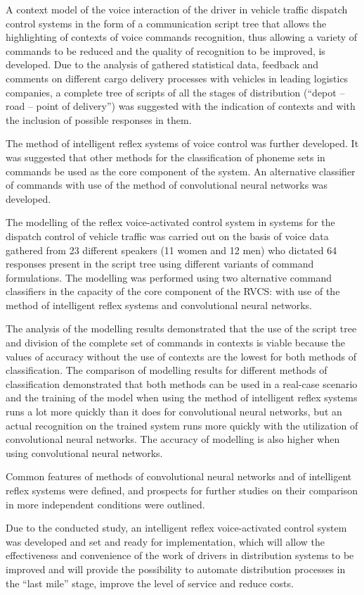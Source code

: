 \documentclass[review,authoryear]{elsarticle}
\begin{document}
A context model of the voice interaction of the driver in vehicle traffic dispatch control systems in the form of a communication script tree that allows the highlighting of contexts of voice commands recognition, thus allowing a variety of commands to be reduced and the quality of recognition to be improved, is developed. Due to the analysis of gathered statistical data, feedback and comments on different cargo delivery processes with vehicles in leading logistics companies, a complete tree of scripts of all the stages of distribution (“depot – road – point of delivery”) was suggested with the indication of contexts and with the inclusion of possible responses in them. 

The method of intelligent reflex systems of voice control was further developed. It was suggested that other methods for the classification of phoneme sets in commands be used as the core component of the system.  An alternative classifier of commands with use of the method of convolutional neural networks was developed. 

The modelling of the reflex voice-activated control system  in systems for the dispatch control of vehicle traffic was carried out on the basis of voice data gathered from 23 different speakers (11 women and 12 men) who dictated 64 responses present in the script tree using different variants of command formulations. The modelling was performed using two alternative command classifiers in the capacity of the core component of the RVCS: with use of the method of intelligent reflex systems and convolutional neural networks. 

The analysis of the modelling results demonstrated that the use of the script tree and division of the complete set of commands in contexts is viable because the values of accuracy without the use of contexts are the lowest for both methods of classification. The comparison of modelling results for different methods of classification demonstrated that both methods can be used in a real-case scenario and the training of the model when using the method of intelligent reflex systems runs a lot more quickly than it does for convolutional neural networks, but an actual recognition on the trained system runs more quickly with the utilization of convolutional neural networks. The accuracy of modelling is also higher when using convolutional neural networks. 

Common features of methods of convolutional neural networks and of intelligent reflex systems were defined, and prospects for further studies on their comparison in more independent conditions were outlined. 

Due to the conducted study, an intelligent reflex voice-activated control system  was developed and set and ready for implementation, which will allow the effectiveness and convenience of the work of drivers in distribution systems to be improved and will provide the possibility to automate distribution processes in the “last mile” stage, improve the level of service and reduce costs. 


\end{document}
